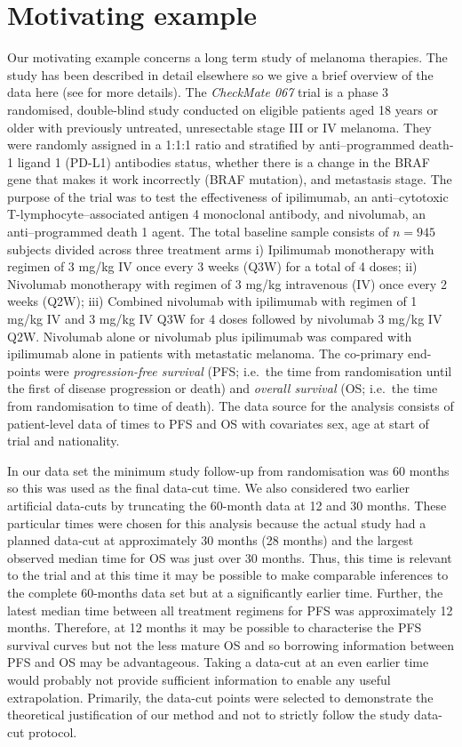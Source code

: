 \documentclass[AMA,STIX1COL]{WileyNJD-v2}
\begin{document}
\section{Motivating example}\label{sec:example}
Our motivating example concerns a long term study of melanoma therapies.
The study has been described in detail elsewhere so we give a brief overview of the data here (see \citep{Wolchok2017, Larkin2019, Hodi2018} for more details).
The \textit{CheckMate 067} trial is a phase 3 randomised, double-blind study conducted on eligible patients aged 18 years or older with previously untreated, unresectable stage III or IV melanoma.
They were randomly assigned in a 1:1:1 ratio and stratified by anti–programmed death-1 ligand 1 (PD-L1) antibodies status, whether there is a change in the BRAF gene that makes it work incorrectly (BRAF mutation), and metastasis stage.
The purpose of the trial was to test the effectiveness of ipilimumab, an anti–cytotoxic T-lymphocyte–associated antigen 4 monoclonal antibody, and nivolumab, an anti–programmed death 1 agent.
The total baseline sample consists of $n = 945$ subjects divided across three treatment arms
i) Ipilimumab monotherapy with regimen of 3 mg/kg IV once every 3 weeks (Q3W) for a total of 4 doses;
ii) Nivolumab monotherapy with regimen of 3 mg/kg intravenous (IV) once every 2 weeks (Q2W);
iii) Combined nivolumab with ipilimumab with regimen of 1 mg/kg IV and 3 mg/kg IV Q3W for 4 doses followed by nivolumab 3 mg/kg IV Q2W.
Nivolumab alone or nivolumab plus ipilimumab was compared with ipilimumab alone in patients with metastatic melanoma.
The co-primary end-points were \textit{progression-free survival} (PFS; i.e.~the time from randomisation until the first of disease progression or death) and \textit{overall survival} (OS; i.e.~the time from randomisation to time of death).
The data source for the analysis consists of patient-level data of times to PFS and OS with covariates sex, age at start of trial and nationality.

In our data set the minimum study follow-up from randomisation was 60 months so this was used as the final data-cut time.
We also considered two earlier artificial data-cuts by truncating the 60-month data at 12 and 30 months.
These particular times were chosen for this analysis because the actual study had a planned data-cut at approximately 30 months (28 months) and the largest observed median time for OS was just over 30 months. Thus, this time is relevant to the trial and at this time it may be possible to make comparable inferences to the complete 60-months data set but at a significantly earlier time.
Further, the latest median time between all treatment regimens for PFS was approximately 12 months. Therefore, at 12 months it may be possible to characterise the PFS survival curves but not the less mature OS and so borrowing information between PFS and OS may be advantageous. Taking a data-cut at an even earlier time would probably not provide sufficient information to enable any useful extrapolation. Primarily, the data-cut points were selected to demonstrate the theoretical justification of our method and not to strictly follow the study data-cut protocol.
\end{document}
